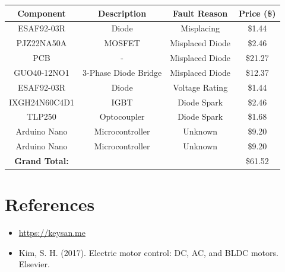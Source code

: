 \documentclass[12pt]{article}
\begin{document}
\begin{tabular}{|c|c|c|c|}
    \hline
    \textbf{Component} & \textbf{Description} & \textbf{Fault Reason} & \textbf{Price (\$)}  \\ \hline
    ESAF92-03R & Diode & Misplacing &  \$1.44 \\ \hline
    PJZ22NA50A & MOSFET & Misplaced Diode & \$2.46 \\ \hline
    PCB & - & Misplaced Diode & \$21.27 \\ \hline
    GUO40-12NO1 & 3-Phase Diode Bridge & Misplaced Diode & \$12.37 \\ \hline
    ESAF92-03R & Diode & Voltage Rating &  \$1.44 \\ \hline
    IXGH24N60C4D1 & IGBT & Diode Spark & \$2.46 \\ \hline
    TLP250 & Optocoupler & Diode Spark & \$1.68 \\ \hline
    Arduino Nano & Microcontroller & Unknown & \$9.20 \\ \hline
    Arduino Nano & Microcontroller & Unknown & \$9.20 \\ \hline
    \textbf{Grand Total:} & & & \$61.52 \\ \hline
\end{tabular}
\section{\Large References}
\begin{itemize}
    \item \url{https://keysan.me} 
    \item Kim, S. H. (2017). Electric motor control: DC, AC, and BLDC motors. Elsevier.
\end{itemize}
\end{document}
